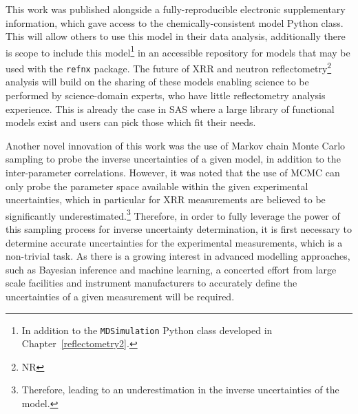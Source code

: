 This work was published alongside a fully-reproducible electronic supplementary information, which gave access to the chemically-consistent model Python class.
This will allow others to use this model in their data analysis, additionally there is scope to include this model\footnote{In addition to the \texttt{MDSimulation} Python class developed in Chapter~\ref{reflectometry2}.} in an accessible repository for models that may be used with the \texttt{refnx} package.
The future of XRR and neutron reflectometry\footnote{NR} analysis will build on the sharing of these models enabling science to be performed by science-domain experts, who have little reflectometry analysis experience.
This is already the case in SAS where a large library of functional models exist and users can pick those which fit their needs.

Another novel innovation of this work was the use of Markov chain Monte Carlo sampling to probe the inverse uncertainties of a given model, in addition to the inter-parameter correlations.
However, it was noted that the use of MCMC can only probe the parameter space available within the given experimental uncertainties, which in particular for XRR measurements are believed to be significantly underestimated.\footnote{Therefore, leading to an underestimation in the inverse uncertainties of the model.}
Therefore, in order to fully leverage the power of this sampling process for inverse uncertainty determination, it is first necessary to determine accurate uncertainties for the experimental measurements, which is a non-trivial task.
As there is a growing interest in advanced modelling approaches, such as Bayesian inference and machine learning, a concerted effort from large scale facilities and instrument manufacturers to accurately define the uncertainties of a given measurement will be required.

